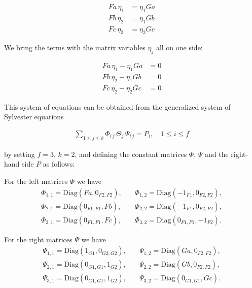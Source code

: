 \begin{example}
\begin{subequations}\label{eq:naturality_constraints_c3c3}
\begin{align}
Fa\,\eta_{1} &= \eta_{1} Ga \\
Fb\,\eta_{2} &= \eta_{1} Gb \\
Fc\,\eta_{2} &= \eta_{2} Gc
\end{align}
\end{subequations}

We bring the terms with the matrix variables $\eta_{j}$ all on one side:

\begin{subequations}
\begin{align}
Fa\,\eta_{1} - \eta_{1} Ga &= 0 \\
Fb\,\eta_{2} - \eta_{1} Gb &= 0 \\
Fc\,\eta_{2} - \eta_{2} Gc &= 0
\end{align}
\end{subequations}

This system of equations can be obtained from the generalized system of Sylvester equations

\begin{align}\label{eq:general_sylvester_equations}
\sum_{1\leq j \leq k} \Phi_{i\,j}\, \Theta_{j}\, \Psi_{i\,j} = P_{i}, \quad 1\leq i \leq f
\end{align}

by setting $f = 3$, $k = 2$, and defining the constant matrices $\Phi$, $\Psi$ and the right-hand side $P$ as follows:

For the left matrices $\Phi$ we have
\begin{align*}
\Phi_{1,1} = \mathrm{Diag}(Fa, 0_{F2,F2}), &\quad \Phi_{1,2} = \mathrm{Diag}(-1_{F1}, 0_{F2,F2}), \\
\Phi_{2,1} = \mathrm{Diag}(0_{F1,F1}, Fb), &\quad \Phi_{2,2} = \mathrm{Diag}(-1_{F1}, 0_{F2,F2}), \\
\Phi_{3,1} = \mathrm{Diag}(0_{F1,F1}, Fc), &\quad \Phi_{3,2} = \mathrm{Diag}(0_{F1,F1}, -1_{F2}).
\end{align*}

For the right matrices $\Psi$ we have
\begin{align*}
\Psi_{1,1} = \mathrm{Diag}(1_{G1}, 0_{G2,G2}), &\quad \Psi_{1,2} = \mathrm{Diag}(Ga, 0_{F2,F2}), \\
\Psi_{2,1} = \mathrm{Diag}(0_{G1,G1}, 1_{G2}), &\quad \Psi_{2,2} = \mathrm{Diag}(Gb, 0_{F2,F2}), \\
\Psi_{3,1} = \mathrm{Diag}(0_{G1,G1}, 1_{G2}), &\quad \Psi_{3,2} = \mathrm{Diag}(0_{G1,G1}, Gc).
\end{align*}


\end{example}
